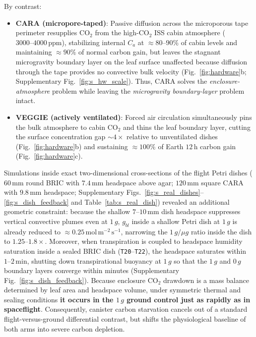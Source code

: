 \documentclass[10pt,twocolumn,a4paper]{article}
\newcommand{\molms}{\ensuremath{\mathrm{mol\,m^{-2}\,s^{-1}}}}
\begin{document}
By contrast:
\begin{itemize}
    \item \textbf{CARA (micropore-taped)}: Passive diffusion across the microporous tape perimeter resupplies $\mathrm{CO_2}$ from the high-$\mathrm{CO_2}$ ISS cabin atmosphere ($3000\text{--}4000\,\mathrm{ppm}$), stabilizing internal $C_a$ at $\approx 80\text{--}90\%$ of cabin levels and maintaining \textbf{$\approx 90\%$} of normal carbon gain, but leaves the stagnant microgravity boundary layer on the leaf surface unaffected because diffusion through the tape provides no convective bulk velocity (Fig.~\ref{fig:hardware}b; Supplementary Fig.~\ref{fig:s_hw_scale}). Thus, CARA solves the \emph{enclosure-atmosphere} problem while leaving the \emph{microgravity boundary-layer} problem intact.
    \item \textbf{VEGGIE (actively ventilated)}: Forced air circulation simultaneously pins the bulk atmosphere to cabin $\mathrm{CO_2}$ and thins the leaf boundary layer, cutting the surface concentration gap $\sim 4\times$ relative to unventilated dishes (Fig.~\ref{fig:hardware}b) and sustaining \textbf{$\approx 100\%$} of Earth $12\,\mathrm{h}$ carbon gain (Fig.~\ref{fig:hardware}c).
\end{itemize}

Simulations inside exact two-dimensional cross-sections of the flight Petri dishes ($60\,\mathrm{mm}$ round BRIC with $7.4\,\mathrm{mm}$ headspace above agar; $120\,\mathrm{mm}$ square CARA with $9.8\,\mathrm{mm}$ headspace; Supplementary Figs.~\ref{fig:s_real_dishes}--\ref{fig:s_dish_feedback} and Table~\ref{tab:s_real_dish}) revealed an additional geometric constraint: because the shallow $7\text{--}10\,\mathrm{mm}$ dish headspace suppresses vertical convective plumes even at $1\,g$, $g_{bl}$ inside a shallow Petri dish at $1\,g$ is already reduced to $\approx 0.25\,\molms$, narrowing the $1\,g/\mu g$ ratio inside the dish to $1.25\text{--}1.8\times$. Moreover, when transpiration is coupled to headspace humidity saturation inside a sealed BRIC dish (\texttt{T20}--\texttt{T22}), the headspace saturates within $1\text{--}2\,\mathrm{min}$, shutting down transpirational buoyancy at $1\,g$ so that the $1\,g$ and $0\,g$ boundary layers converge within minutes (Supplementary Fig.~\ref{fig:s_dish_feedback}). Because enclosure $\mathrm{CO_2}$ drawdown is a mass balance determined by leaf area and headspace volume, under symmetric thermal and sealing conditions \textbf{it occurs in the $1\,g$ ground control just as rapidly as in spaceflight}. Consequently, canister carbon starvation cancels out of a standard flight-versus-ground differential contrast, but shifts the physiological baseline of both arms into severe carbon depletion.
\end{document}
